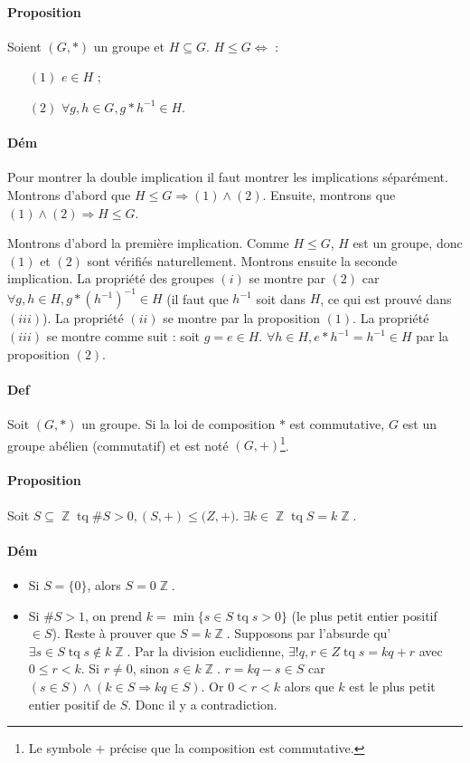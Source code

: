 \documentclass{article}
\newenvironment{lst}
	{\begin{minipage}[t]{.9\linewidth}\begin{itemize}}
	{\end{itemize}\end{minipage}}
\DeclareMathOperator{\tq}{\text{ tq }}
\DeclareMathOperator{\Z}{\mathbb Z}
\begin{document}
			\paragraph{Proposition} Soient $(G, *)$ un groupe et $H \subseteq G$. $H \leq G \iff$ :

			\begin{itemize}
				\item[$(1)$] $e \in H$ ;
				\item[$(2)$] $\forall g, h \in G, g*h^{-1} \in H$.
			\end{itemize}

			\paragraph{Dém} Pour montrer la double implication il faut montrer les implications séparément. Montrons d'abord que $H \leq G \Rightarrow
			(1) \land (2)$. Ensuite, montrons que $(1) \land (2) \Rightarrow H \leq G$.

			Montrons d'abord la première implication. Comme $H \leq G$, $H$ est un groupe, donc $(1)$ et $(2)$ sont vérifiés naturellement.
			Montrons ensuite la seconde implication. La propriété des groupes $(i)$ se montre par $(2)$ car $\forall g, h \in H, g*(h^{-1})^{-1}
			\in H$ (il faut que $h^{-1}$ soit dans $H$, ce qui est prouvé dans $(iii)$). La propriété $(ii)$ se montre par la proposition $(1)$.
			La propriété $(iii)$ se montre comme suit : soit $g = e \in H$. $\forall h \in H, e * h^{-1} = h^{-1} \in H$ par la proposition $(2)$.

			\paragraph{Def} Soit $(G, *)$ un groupe. Si la loi de composition $*$ est commutative, $G$ est un groupe abélien (commutatif) et est noté
			$(G, +)$\footnote{Le symbole $+$ précise que la composition est commutative.}.

			\paragraph{Proposition} Soit $S \subseteq \Z \tq \#S > 0, (S, +) \leq \mathbb (Z, +)$. $\exists k \in \Z \tq S = k \Z$.

			\paragraph{Dém}
			\begin{lst}
				\item Si $S = \{0\}$, alors $S = 0\Z$.
				\item Si $\#S > 1$, on prend $k = \min\{s \in S \tq s > 0\}$ (le plus petit entier positif $\in S$). Reste à prouver que $S = k\Z$.
					  Supposons par l'absurde qu'$\exists s \in S \tq s \not \in k\Z$. Par la division euclidienne, $\exists! q, r \in Z \tq s = kq + r$
					  avec $0 \leq r < k$. Si $r \neq 0$, sinon $s \in k\Z$. $r = kq - s \in S$ car $(s \in S) \land (k \in S \Rightarrow kq \in S)$.
					  Or $0 < r < k$ alors que $k$ est le plus petit entier positif de $S$. Donc il y a contradiction.
			\end{lst}
\end{document}

